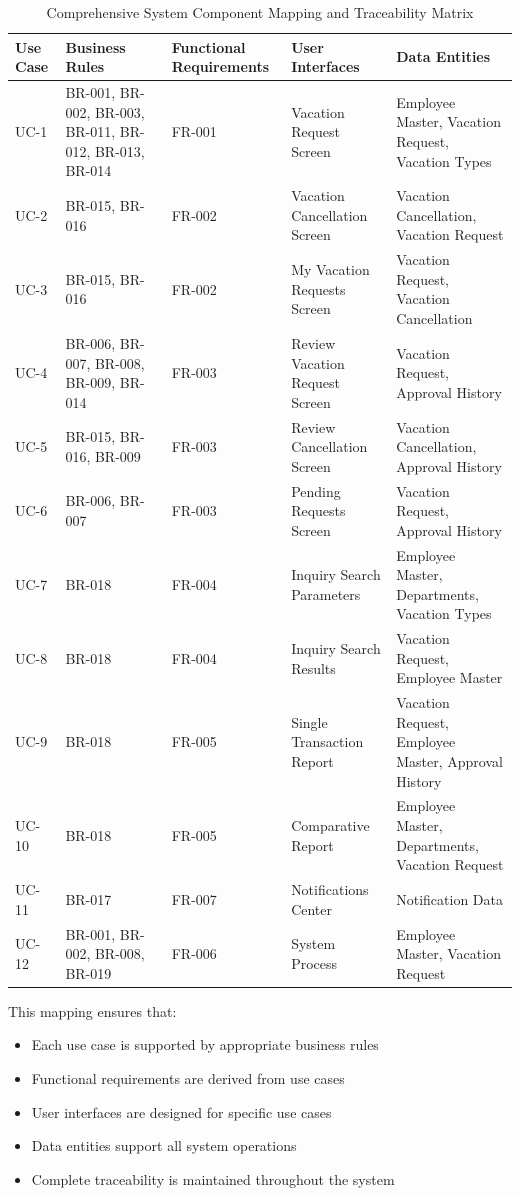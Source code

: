 \documentclass[12pt,a4paper]{article}
\begin{document}
\begin{table}[H]
\centering
\begin{tabular}{|p{2cm}|p{2.5cm}|p{2.5cm}|p{2.5cm}|p{2.5cm}|}
\hline
\textbf{Use Case} & \textbf{Business Rules} & \textbf{Functional Requirements} & \textbf{User Interfaces} & \textbf{Data Entities} \\
\hline
UC-1 & BR-001, BR-002, BR-003, BR-011, BR-012, BR-013, BR-014 & FR-001 & Vacation Request Screen & Employee Master, Vacation Request, Vacation Types \\
\hline
UC-2 & BR-015, BR-016 & FR-002 & Vacation Cancellation Screen & Vacation Cancellation, Vacation Request \\
\hline
UC-3 & BR-015, BR-016 & FR-002 & My Vacation Requests Screen & Vacation Request, Vacation Cancellation \\
\hline
UC-4 & BR-006, BR-007, BR-008, BR-009, BR-014 & FR-003 & Review Vacation Request Screen & Vacation Request, Approval History \\
\hline
UC-5 & BR-015, BR-016, BR-009 & FR-003 & Review Cancellation Screen & Vacation Cancellation, Approval History \\
\hline
UC-6 & BR-006, BR-007 & FR-003 & Pending Requests Screen & Vacation Request, Approval History \\
\hline
UC-7 & BR-018 & FR-004 & Inquiry Search Parameters & Employee Master, Departments, Vacation Types \\
\hline
UC-8 & BR-018 & FR-004 & Inquiry Search Results & Vacation Request, Employee Master \\
\hline
UC-9 & BR-018 & FR-005 & Single Transaction Report & Vacation Request, Employee Master, Approval History \\
\hline
UC-10 & BR-018 & FR-005 & Comparative Report & Employee Master, Departments, Vacation Request \\
\hline
UC-11 & BR-017 & FR-007 & Notifications Center & Notification Data \\
\hline
UC-12 & BR-001, BR-002, BR-008, BR-019 & FR-006 & System Process & Employee Master, Vacation Request \\
\hline
\end{tabular}
\caption{Comprehensive System Component Mapping and Traceability Matrix}
\end{table}

This mapping ensures that:
\begin{itemize}
    \item Each use case is supported by appropriate business rules
    \item Functional requirements are derived from use cases
    \item User interfaces are designed for specific use cases
    \item Data entities support all system operations
    \item Complete traceability is maintained throughout the system
\end{itemize}
\end{document}
